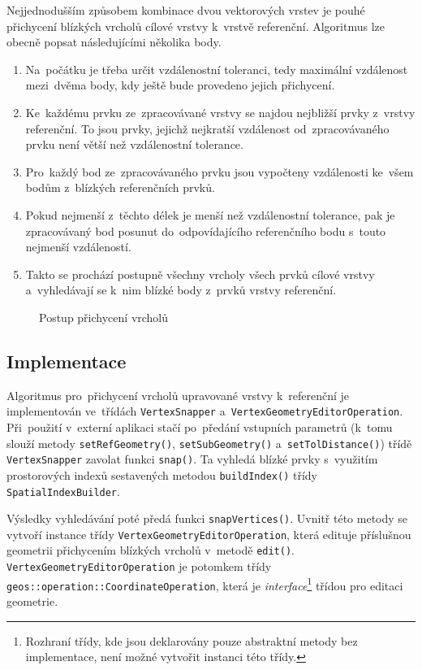 Nejjednodušším způsobem kombinace dvou vektorových vrstev je pouhé přichycení 
blízkých vrcholů cílové vrstvy k~vrstvě referenční. Algoritmus lze obecně 
popsat následujícími několika body.

\begin{enumerate}
 \item Na~počátku je třeba určit vzdálenostní toleranci, tedy maximální 
    vzdálenost mezi~dvěma body, kdy ještě bude provedeno jejich přichycení.
 \item Ke~každému prvku ze~zpracovávané vrstvy se najdou nejbližší prvky 
    z~vrstvy referenční. To jsou prvky, jejichž nejkratší vzdálenost 
    od~zpracovávaného prvku není větší	než vzdálenostní tolerance.
 \item Pro~každý bod ze~zpracovávaného prvku jsou vypočteny vzdálenosti 
    ke~všem bodům z~blízkých referenčních prvků.
 \item Pokud nejmenší z~těchto délek je menší než vzdálenostní tolerance, 
    pak je zpracovávaný bod posunut do~odpovídajícího referenčního bodu 
    s~touto nejmenší vzdáleností.
 \item Takto se prochází postupně všechny vrcholy všech prvků cílové vrstvy 
    a~vyhledávají se k~nim blízké body z~prvků vrstvy referenční. 
\end{enumerate}

\label{vspic}
  \begin{figure}[h!]
    \centering
      
      \caption{Postup přichycení vrcholů}
      \label{fig:vs-princip}
  \end{figure}


\subsection{Implementace}
\label{vs-implementace}
Algoritmus pro~přichycení vrcholů upravované vrstvy k~referenční 
je implementován ve~třídách \texttt{Vertex\-Snapper} 
a~\texttt{Vertex\-Geometry\-Editor\-Operation}. Při~použití v~externí 
aplikaci stačí po~předání vstupních parametrů (k~tomu slouží metody 
\texttt{setRefGeometry()}, \texttt{setSubGeometry()} 
a~\texttt{setTolDistance()}) třídě \texttt{Vertex\-Snapper} zavolat 
funkci \texttt{snap()}. Ta vyhledá blízké prvky s~využitím prostorových 
indexů sesta\-vených metodou \texttt{build\-Index()} třídy 
\texttt{Spatial\-Index\-Builder}.

Výsledky vyhledávání poté předá funkci \texttt{snap\-Vertices()}. 
Uvnitř této metody se vytvoří instance  třídy 
\texttt{Vertex\-Geometry\-Editor\-Operation}, která edituje příslušnou 
geometrii přichycením blízkých vrcholů v~metodě \texttt{edit()}. 
\texttt{Vertex\-Geometry\-Editor\-Operation} je potomkem třídy 
\texttt{geos::\-operation::\-Coordinate\-Operation}, která je 
\textit{inter\-face}\footnote{Rozhraní třídy, kde jsou deklarovány 
pouze abstraktní metody bez implementace, není možné vytvořit 
instanci této třídy.} třídou pro editaci geometrie.

